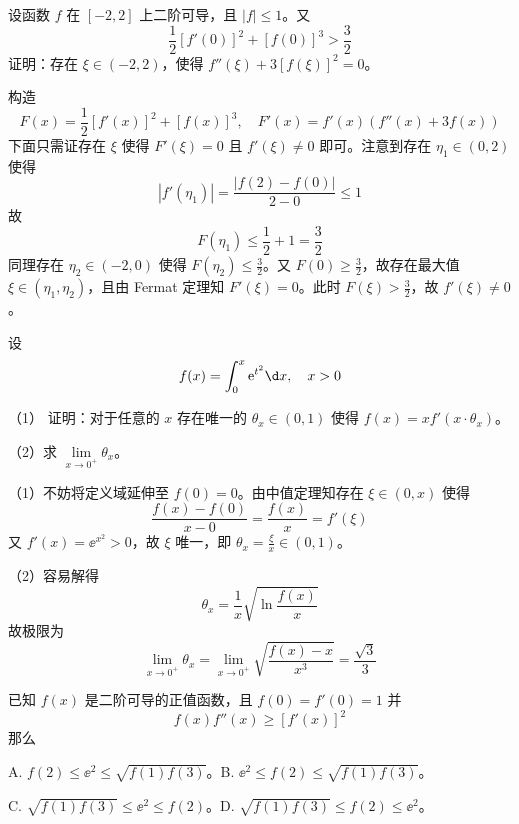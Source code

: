 \begin{problem}[000024]
设函数 $f$ 在 $[-2, 2]$ 上二阶可导，且 $|f| \leqslant 1$。又
\[ \frac{1}{2}[f'(0)]^2 + [f(0)]^3 > \frac{3}{2} \]
证明：存在 $\xi \in (-2,2)$，使得 $f''(\xi) + 3[f(\xi)]^2 = 0$。
\end{problem}

\begin{solution}
	构造
	\[ F(x) = \frac{1}{2}[f'(x)]^2 + [f(x)]^3,\quad F'(x) = f'(x)(f''(x) + 3f(x)) \]
	下面只需证存在 $\xi$ 使得 $F'(\xi) = 0$ 且 $f'(\xi) \neq 0$ 即可。注意到存在 $\eta_1 \in (0, 2)$ 使得
	\[ |f'(\eta_1)| = \frac{|f(2) - f(0)|}{2 - 0} \leqslant 1 \]
	故
	\[ F(\eta_1) \leqslant \frac{1}{2} + 1 = \frac{3}{2} \]
	同理存在 $\eta_2 \in (-2, 0)$ 使得 $F(\eta_2) \leqslant \frac{3}{2}$。又 $F(0) \geqslant \frac{3}{2}$，故存在最大值 $\xi \in (\eta_1, \eta_2)$，且由 Fermat 定理知 $F'(\xi) = 0$。此时 $F(\xi) > \frac{3}{2}$，故 $f'(\xi) \neq 0$。
\end{solution}


\begin{problem}[000025]
设
\[ f(x) = \int_{0}^{x} \ee^{t^2} \d x, \quad x > 0 \]

（1） 证明：对于任意的 $x$ 存在唯一的 $\theta_x \in (0, 1)$ 使得 $f(x) = x f'(x \cdot \theta_x)$。

（2）求 $\lim\limits_{x \to 0^+} \theta_x$。
\end{problem}

\begin{solution}
	（1）不妨将定义域延伸至 $f(0) = 0$。由中值定理知存在 $\xi \in (0, x)$ 使得
	\[ \frac{f(x) - f(0)}{x - 0} = \frac{f(x)}{x} = f'(\xi) \]
	又 $f'(x) = \ee^{x^2} > 0$，故 $\xi$ 唯一，即 $\theta_x = \frac{\xi}{x} \in (0, 1)$。

	（2）容易解得
	\[ \theta_x = \frac{1}{x} \sqrt{\ln \frac{f(x)}{x}} \]
	故极限为
	\[ \lim_{x \to 0^+} \theta_x = \lim_{x \to 0^+} \sqrt{\frac{f(x) - x}{x^3}} = \frac{\sqrt{3}}{3} \]
\end{solution}

\begin{problem}[000026]
已知 $f(x)$ 是二阶可导的正值函数，且 $f(0) = f'(0) = 1$ 并
\[ f(x) f''(x) \geqslant [f'(x)]^2 \]
那么

A. $f(2) \leqslant \ee^2 \leqslant \sqrt{f(1)f(3)}$。B. $\ee^2 \leqslant f(2) \leqslant \sqrt{f(1)f(3)}$。

C. $\sqrt{f(1)f(3)} \leqslant \ee^2 \leqslant f(2)$。D. $\sqrt{f(1)f(3)} \leqslant f(2) \leqslant \ee^2$。
\end{problem}

